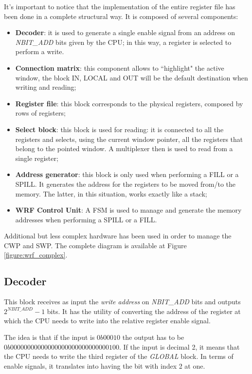 It's important to notice that the implementation of the entire register file has been done in a complete structural way. It is composed of several components:
\begin{itemize}
	\item \textbf{Decoder}: it is used to generate a single enable signal from an address on \emph{NBIT\_ADD} bits given by the CPU; in this way, a register is selected to perform a write. 
	\item \textbf{Connection matrix}: this component allows to ``highlight" the active window, the block IN, LOCAL and OUT will be the default destination when writing and reading;
	\item \textbf{Register file}: this block corresponds to the physical registers, composed by rows of registers;
	\item \textbf{Select block}: this block is used for reading: it is connected to all the registers and selects, using the current window pointer, all the registers that belong to the pointed window. A multiplexer then is used to read from a single register;
	\item \textbf{Address generator}: this block is only used when performing a FILL or a SPILL. It generates the address for the registers to be moved from/to the memory. The latter, in this situation, works exactly like a stack;
	\item \textbf{WRF Control Unit}: A FSM is used to manage and generate the memory addresses when performing a SPILL or a FILL.
\end{itemize}

Additional but less complex hardware has been used in order to manage the CWP and SWP. The complete diagram is available at Figure \ref{figure:wrf_complex}.


\subsection{Decoder}
This block receives as input the \emph{write address} on \emph{NBIT\_ADD} bits and outputs \(2^{NBIT\_ADD} - 1 \) bits. It has the utility of converting the address of the register at which the CPU needs to write into the relative register enable signal. 

The idea is that if the input is \(0b00010\) the output has to be \(0b00000000000000000000000000000100\). If the input is decimal 2, it means that the CPU needs to write the third register of the \emph{GLOBAL} block. In terms of enable signals, it translates into having the bit with index 2 at one. \\

